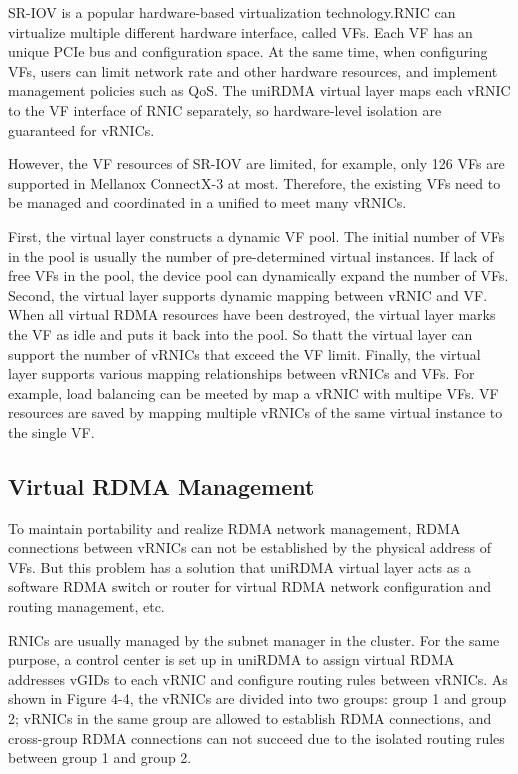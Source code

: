 \documentclass[sigplan,screen]{acmart}
\begin{document}
SR-IOV is a popular hardware-based virtualization technology.RNIC can virtualize multiple different hardware interface, called VFs. Each VF has an unique PCIe bus and configuration space. At the same time, when configuring VFs, users can limit network rate and other hardware resources, and implement management policies such as QoS. The uniRDMA virtual layer maps each vRNIC to the VF interface of RNIC separately, so hardware-level isolation are guaranteed for vRNICs.

However, the VF resources of SR-IOV are limited, for example, only 126 VFs are supported in Mellanox ConnectX-3 at most. Therefore, the existing VFs need to be managed and coordinated in a unified to meet many vRNICs.

First, the virtual layer constructs a dynamic VF pool. The initial number of VFs in the pool is usually the number of pre-determined virtual instances. If lack of free VFs in the pool, the device pool can dynamically expand the number of VFs. Second, the virtual layer supports dynamic mapping between vRNIC and VF. When all virtual RDMA resources have been destroyed, the virtual layer marks the VF as idle and puts it back into the pool. So thatt the virtual layer can support the number of vRNICs that exceed the VF limit. Finally, the virtual layer supports various mapping relationships between vRNICs and VFs. For example, load balancing can be meeted by map a vRNIC with multipe VFs. VF resources are saved by mapping multiple vRNICs of the same virtual instance to the single VF. 

\subsection{Virtual RDMA Management}
To maintain portability and realize RDMA network management, RDMA connections between vRNICs can not be established by the physical address of VFs. But this problem has a solution that uniRDMA virtual layer acts as a software RDMA switch or router for virtual RDMA network configuration and routing management, etc.

RNICs are usually managed by the subnet manager in the cluster. For the same purpose, a control center is set up in uniRDMA to assign virtual RDMA addresses vGIDs to each vRNIC and configure routing rules between vRNICs. As shown in Figure 4-4, the vRNICs are divided into two groups: group 1 and group 2; vRNICs in the same group are allowed to establish RDMA connections, and cross-group RDMA connections can not succeed due to the isolated routing rules between group 1 and group 2.
\end{document}
